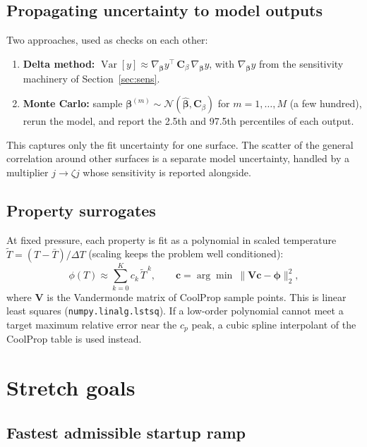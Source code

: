 \documentclass[11pt]{article}
\begin{document}
\subsection{Propagating uncertainty to model outputs}

Two approaches, used as checks on each other:
\begin{enumerate}
  \item \textbf{Delta method:} $\operatorname{Var}[y] \approx \nabla_{\bm\beta}y^\top\,\bm C_\beta\,\nabla_{\bm\beta}y$, with $\nabla_{\bm\beta}y$ from the sensitivity machinery of Section~\ref{sec:sens}.
  \item \textbf{Monte Carlo:} sample $\bm\beta^{(m)} \sim \mathcal N(\hat{\bm\beta}, \bm C_\beta)$ for $m = 1,\dots,M$ (a few hundred), rerun the model, and report the 2.5th and 97.5th percentiles of each output.
\end{enumerate}
This captures only the fit uncertainty for one surface. The scatter of the general correlation around other surfaces is a separate model uncertainty, handled by a multiplier $j \to \zeta j$ whose sensitivity is reported alongside.

\subsection{Property surrogates}
\label{sec:propfit}

At fixed pressure, each property is fit as a polynomial in scaled temperature $\tilde T = (T - \bar T)/\Delta T$ (scaling keeps the problem well conditioned):
\begin{equation}
  \phi(T) \approx \sum_{k=0}^{K} c_k\,\tilde T^{\,k},
  \qquad
  \bm c = \arg\min\ \|\bm V\bm c - \bm\phi\|_2^2,
\end{equation}
where $\bm V$ is the Vandermonde matrix of CoolProp sample points. This is linear least squares (\texttt{numpy.linalg.lstsq}). If a low-order polynomial cannot meet a target maximum relative error near the $c_p$ peak, a cubic spline interpolant of the CoolProp table is used instead.

\section{Stretch goals}

\subsection{Fastest admissible startup ramp}
\end{document}
